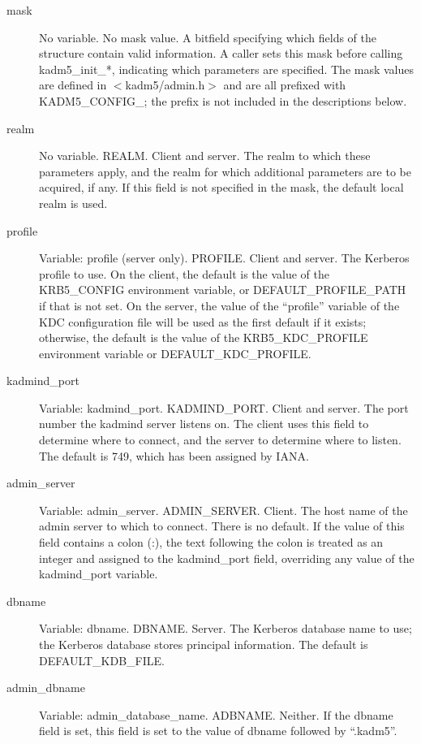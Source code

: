 \begin{description}
\item[mask] No variable.  No mask value.  A bitfield specifying which
fields of the structure contain valid information.  A caller sets this
mask before calling kadm5_init_*, indicating which parameters are
specified.  The mask values are defined in $<$kadm5/admin.h$>$ and are
all prefixed with KADM5_CONFIG_; the prefix is not included in the
descriptions below.

\item[realm] No variable.  REALM.  Client and server.  The realm to
which these parameters apply, and the realm for which additional
parameters are to be acquired, if any.  If this field is not specified
in the mask, the default local realm is used.

\item[profile] Variable: profile (server only).  PROFILE.  Client and
server.  The Kerberos profile to use.  On the client, the default is
the value of the KRB5_CONFIG environment variable, or
DEFAULT_PROFILE_PATH if that is not set.  On the server, the value of
the ``profile'' variable of the KDC configuration file will be used as
the first default if it exists; otherwise, the default is the value of
the KRB5_KDC_PROFILE environment variable or DEFAULT_KDC_PROFILE.

\item[kadmind_port] Variable: kadmind_port.  KADMIND_PORT.  Client and
server.  The port number the kadmind server listens on.  The client
uses this field to determine where to connect, and the server to
determine where to listen.  The default is 749, which has been
assigned by IANA.

\item[admin_server] Variable: admin_server.  ADMIN_SERVER.  Client.
The host name of the admin server to which to connect.  There is no
default.  If the value of this field contains a colon (:), the text
following the colon is treated as an integer and assigned to the
kadmind_port field, overriding any value of the kadmind_port variable.

\item[dbname] Variable: dbname.  DBNAME.  Server.  The Kerberos
database name to use; the Kerberos database stores principal
information.  The default is DEFAULT_KDB_FILE.

\item[admin_dbname] Variable: admin_database_name.  ADBNAME.
Neither.  If the dbname field is set, this field is set to the value
of dbname followed by ``.kadm5''.


\end{description}
